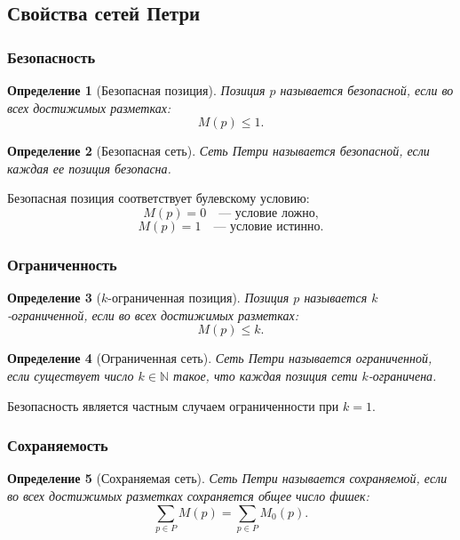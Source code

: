 \documentclass[12pt,a4paper]{article}
\newtheorem{definition}{Определение}
\begin{document}
\subsection{Свойства сетей Петри}

\subsubsection{Безопасность}

\begin{definition}[Безопасная позиция]
Позиция $p$ называется безопасной, если во всех достижимых разметках:
\[
M(p) \le 1.
\]
\end{definition}

\begin{definition}[Безопасная сеть]
Сеть Петри называется безопасной, если каждая ее позиция безопасна.
\end{definition}

Безопасная позиция соответствует булевскому условию:
\[
M(p)=0 \quad \text{--- условие ложно,}
\]
\[
M(p)=1 \quad \text{--- условие истинно.}
\]

\subsubsection{Ограниченность}

\begin{definition}[$k$-ограниченная позиция]
Позиция $p$ называется $k$-ограниченной, если во всех достижимых разметках:
\[
M(p) \le k.
\]
\end{definition}

\begin{definition}[Ограниченная сеть]
Сеть Петри называется ограниченной, если существует число $k \in \mathbb{N}$ такое, что каждая позиция сети $k$-ограничена.
\end{definition}

Безопасность является частным случаем ограниченности при $k=1$.

\subsubsection{Сохраняемость}

\begin{definition}[Сохраняемая сеть]
Сеть Петри называется сохраняемой, если во всех достижимых разметках сохраняется общее число фишек:
\[
\sum_{p\in P} M(p) = \sum_{p\in P} M_0(p).
\]
\end{definition}
\end{document}
